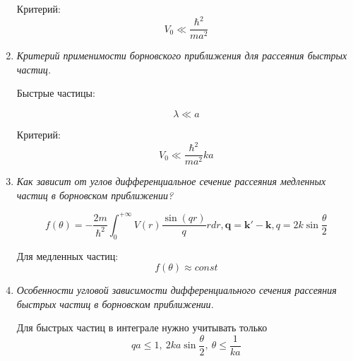 \documentclass{article}
\begin{document}
\begin{enumerate}
		Критерий:
		\begin{equation}
			V_{0}\ll\frac{\hbar^{2}}{ma^{2}}
		\end{equation}
		
		\item \textit{Критерий применимости борновского приближения для рассеяния быстрых частиц.}
		
		Быстрые частицы:
		
		\begin{equation}
			\lambda\ll a
		\end{equation}
		
		Критерий:
		\begin{equation}
			V_{0}\ll\frac{\hbar^{2}}{ma^{2}}ka
		\end{equation}
		
		\item \textit{Как зависит от углов дифференциальное сечение рассеяния медленных частиц в борновском приближении?}
		
		\begin{equation}
			f(\theta)=-\frac{2m}{\hbar^{2}}\int_{0}^{+\infty}V(r)\frac{\sin(qr)}{q}rdr,\boldsymbol{q=k'-k},q=2k\sin\frac{\theta}{2}
		\end{equation}
		
		Для медленных частиц:
		\begin{equation}
			f(\theta)\approx const
		\end{equation}
		
		\item \textit{ Особенности угловой зависимости дифференциального сечения рассеяния быстрых частиц в борновском приближении.}
		
		Для быстрых частиц в интеграле нужно учитывать только
		\begin{equation}
			qa\leq1, \ 2ka\sin\frac{\theta}{2},\ \theta\leq\frac{1}{ka}
		\end{equation}
		
	\end{enumerate}
	
\end{document}

